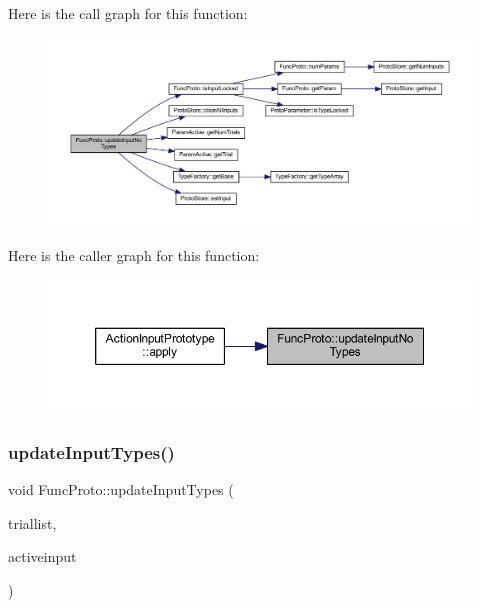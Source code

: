 Here is the call graph for this function\+:
\nopagebreak
\begin{figure}[H]
\begin{center}
\leavevmode
\includegraphics[width=350pt]{class_func_proto_ad2b6986a4cf61f042579472e394ad7f8_cgraph}
\end{center}
\end{figure}
Here is the caller graph for this function\+:
\nopagebreak
\begin{figure}[H]
\begin{center}
\leavevmode
\includegraphics[width=350pt]{class_func_proto_ad2b6986a4cf61f042579472e394ad7f8_icgraph}
\end{center}
\end{figure}
\mbox{\label{class_func_proto_acb98890f848bc9e267c62c30e58a7f5f}} 
\subsubsection{\texorpdfstring{updateInputTypes()}{updateInputTypes()}}
{\footnotesize\ttfamily void Func\+Proto\+::update\+Input\+Types (\begin{DoxyParamCaption}\item[{const vector$<$ \mbox{\hyperlink{class_varnode}{Varnode}} $\ast$ $>$ \&}]{triallist,  }\item[{\mbox{\hyperlink{class_param_active}{Param\+Active}} $\ast$}]{activeinput }\end{DoxyParamCaption})}



